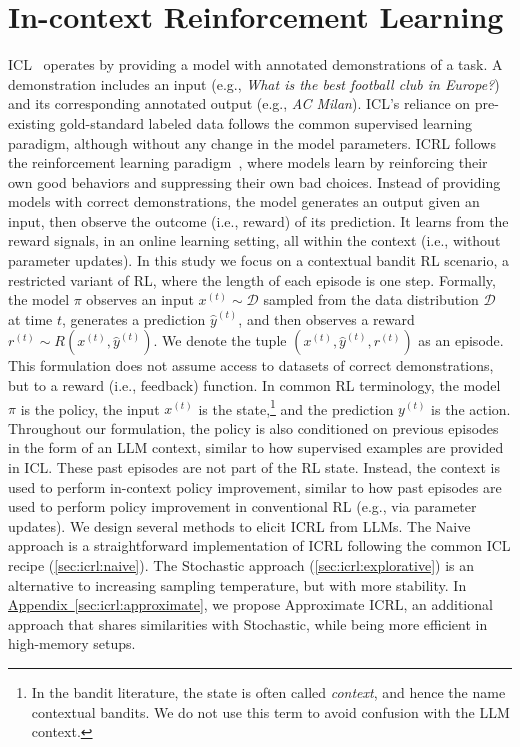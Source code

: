 \documentclass{article}
\theoremstyle{plain}
\theoremstyle{definition}
\theoremstyle{remark}
\newcommand{\aautoref}[1]{\hyperref[#1]{Appendix~\ref*{#1}}}
\newcommand{\example}{x}
\newcommand{\prediction}{y}
\newcommand{\datadist}{\mathcal{D}}
\newcommand{\rewardfunc}{R}
\newcommand{\reward}{r}
\newcommand{\policy}{\pi}
\newcommand{\approximate}{Approximate ICRL\xspace}
\newcommand{\naiveshort}{Naive\xspace}
\newcommand{\expshort}{Stochastic\xspace}
\begin{document}
\section{In-context Reinforcement Learning}\label{sec:icrl}
ICL~\citep{brown2020language} operates by providing a model with  annotated demonstrations of a task.
A demonstration includes an input (e.g., \textit{What is the best football club in Europe?}) and its corresponding annotated output (e.g., \textit{AC Milan}).
ICL's reliance on pre-existing gold-standard labeled data follows the common supervised learning paradigm, although without any change in the model parameters.
ICRL follows the reinforcement learning paradigm~\citep{sutton2018reinforcement}, where models learn by reinforcing their own good behaviors and suppressing their own bad choices.
Instead of providing models with correct demonstrations, the model generates an output given an input, then observe the outcome (i.e., reward) of its prediction. It  learns from the reward signals, in an online learning setting, all within the context (i.e., without parameter updates).
In this study we focus on a contextual bandit RL scenario, a restricted variant of RL, where the length of each episode is one step.
Formally, the model $\policy$ observes an input $\example^{(t)} \sim \datadist$ sampled from the data distribution $\datadist$ at time $t$, generates a prediction $\hat{\prediction}^{(t)}$, and then observes a reward $\reward^{(t)} \sim \rewardfunc(\example^{(t)}, \hat{\prediction}^{(t)})$. We denote the tuple $(\example^{(t)}, \hat{\prediction}^{(t)}, \reward^{(t)})$ as an episode.
This formulation does not assume access to datasets of correct demonstrations, but to a reward (i.e., feedback) function.
In common RL terminology, the model $\policy$ is the policy, the input $\example^{(t)}$ is the state,\footnote{In the bandit literature, the state is often called \emph{context}, and hence the name contextual bandits. We do not use this term to avoid confusion with the LLM context.} and the prediction $\prediction^{(t)}$ is the action.
Throughout our formulation, the policy is also conditioned on previous episodes in the form of an LLM context, similar to how supervised examples are provided in ICL.
These past episodes are not part of the RL state.
Instead, the context is used to perform in-context policy improvement, similar to how past episodes are used to perform policy improvement in conventional RL (e.g., via parameter updates).
We design several methods to elicit ICRL from LLMs.
The \naiveshort approach is a straightforward implementation of ICRL following the common ICL recipe (\autoref{sec:icrl:naive}). The \expshort approach (\autoref{sec:icrl:explorative}) is an alternative to increasing sampling temperature, but with more stability. In \aautoref{sec:icrl:approximate}, we propose \approximate, an additional approach that shares similarities with  \expshort, while being more efficient in high-memory setups.
\end{document}
